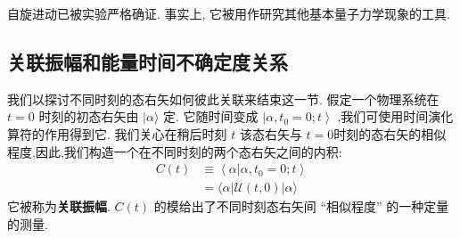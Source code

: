 \documentclass[lang=cn,newtx,10pt,scheme=chinese,thmcnt=section]{elegantbook}
\begin{document}
自旋进动已被实验严格确证. 事实上, 它被用作研究其他基本量子力学现象的工具. 
\subsection*{关联振幅和能量时间不确定度关系}
我们以探讨不同时刻的态右矢如何彼此关联来结束这一节. 假定一个物理系统在 $t = 0$ 时刻的初态右矢由 $|\alpha \rangle$ 定. 它随时间变成 $\left| {\alpha ,{t}_{0} = 0;t}\right\rangle$ ,我们可使用时间演化算符的作用得到它. 我们关心在稍后时刻 $t$ 该态右矢与 $t = 0$时刻的态右矢的相似程度,因此,我们构造一个在不同时刻的两个态右矢之间的内积:
\begin{equation}
	\begin{aligned}
		C\left( t\right) &\equiv \left\langle {\alpha | \alpha ,{t}_{0} = 0;t}\right\rangle\\
		&= \langle \alpha \left| {\mathcal{U}\left( {t,0}\right) }\right| \alpha \rangle
	\end{aligned}
\end{equation}
它被称为\textbf{关联振幅}. $C\left( t\right)$ 的模给出了不同时刻态右矢间 “相似程度” 的一种定量的测量.
\end{document}
